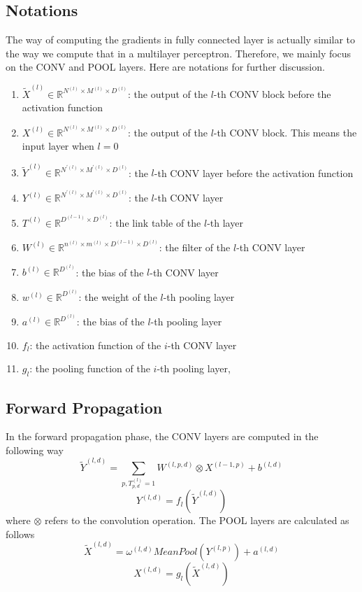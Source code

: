 \documentclass[11pt,a4paper]{article}
\begin{document}
\subsection{Notations}
The way of computing the gradients in fully connected layer is actually similar to the way we compute that in a multilayer perceptron. Therefore, we mainly focus on the CONV and POOL layers. Here are notations for further discussion.
\begin{enumerate}
\item $\tilde{X}^{(l)}\in{}\mathbb{R}^{N^{(l)}\times{}M^{(l)}\times{}D^{(l)}}$: the output of the $l$-th CONV block before the activation function
\item $X^{(l)}\in{}\mathbb{R}^{N^{(l)}\times{}M^{(l)}\times{}D^{(l)}}$: the output of the $l$-th CONV block. This means the input layer when $l=0$
\item $\tilde{Y}^{(l)}\in{}\mathbb{R}^{N^{'(l)}\times{}M^{'(l)}\times{}D^{(l)}}$: the $l$-th CONV layer before the activation function
\item $Y^{(l)}\in{}\mathbb{R}^{N^{'(l)}\times{}M^{'(l)}\times{}D^{(l)}}$: the $l$-th CONV layer
\item $T^{(l)}\in{}\mathbb{R}^{D^{(l-1)}\times{}D^{(l)}}$: the link table of the $l$-th layer
\item $W^{(l)}\in{}\mathbb{R}^{n^{(l)}\times{}m^{(l)}\times{}D^{(l-1)}\times{}D^{(l)}}$: the filter of the $l$-th CONV layer
\item $b^{(l)}\in{}\mathbb{R}^{D^{(l)}}$: the bias of the $l$-th CONV layer
\item $w^{(l)}\in{}\mathbb{R}^{D^{(l)}}$: the weight of the $l$-th pooling layer
\item $a^{(l)}\in{}\mathbb{R}^{D^{(l)}}$: the bias of the $l$-th pooling layer
\item $f_{l}$: the activation function of the $i$-th CONV layer
\item $g_{l}$: the pooling function of the $i$-th pooling layer,
\end{enumerate}
\subsection{Forward Propagation}
In the forward propagation phase, the CONV layers are computed in the following way
\begin{displaymath}
\tilde{Y}^{(l,d)} = \sum_{p,T^{(l)}_{p,d}=1}W^{(l,p,d)}\otimes{}X^{(l-1,p)}+b^{(l,d)}
\end{displaymath}
\begin{displaymath}
Y^{(l,d)} = f_{l}(\tilde{Y}^{(l,d)})
\end{displaymath}
where $\otimes{}$ refers to the convolution operation. The POOL layers are calculated as follows
\begin{displaymath}
\tilde{X}^{(l,d)} = \omega^{(l,d)}MeanPool(Y^{(l,p)})+a^{(l,d)}
\end{displaymath}
\begin{displaymath}
X^{(l,d)} = g_{l}(\tilde{X}^{(l,d)})
\end{displaymath}
\end{document}
